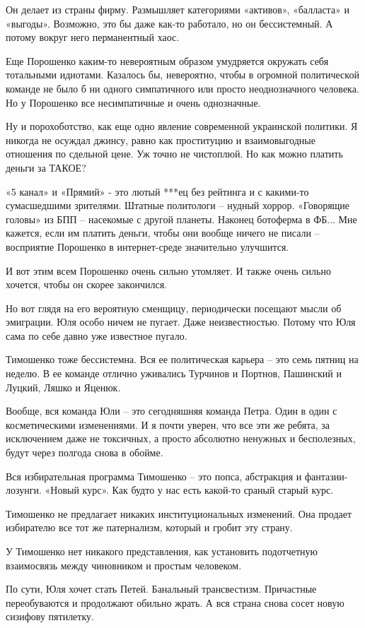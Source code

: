 Он делает из страны фирму. Размышляет категориями «активов», «балласта» и
«выгоды». Возможно, это бы даже как-то работало, но он бессистемный. А потому
вокруг него перманентный хаос.

Еще Порошенко каким-то невероятным образом умудряется окружать себя тотальными
идиотами. Казалось бы, невероятно, чтобы в огромной политической команде не
было б ни одного симпатичного или просто неоднозначного человека. Но у
Порошенко все несимпатичные и очень однозначные.

Ну и порохоботство, как еще одно явление современной украинской политики. Я
никогда не осуждал джинсу, равно как проституцию и взаимовыгодные отношения по
сдельной цене. Уж точно не чистоплюй. Но как можно платить деньги за ТАКОЕ?

«5 канал» и «Прямий» - это лютый ***ец без рейтинга и с какими-то сумасшедшими
зрителями. Штатные политологи – нудный хоррор. «Говорящие головы» из БПП –
насекомые с другой планеты. Наконец ботоферма в ФБ... Мне кажется, если им
платить деньги, чтобы они вообще ничего не писали – восприятие Порошенко в
интернет-среде значительно улучшится.

И вот этим всем Порошенко очень сильно утомляет. И также очень сильно хочется,
чтобы он скорее закончился.

Но вот глядя на его вероятную сменщицу, периодически посещают мысли об
эмиграции. Юля особо ничем не пугает. Даже неизвестностью. Потому что Юля сама
по себе давно уже известное пугало.

Тимошенко тоже бессистемна. Вся ее политическая карьера – это семь пятниц на
неделю. В ее команде отлично уживались Турчинов и Портнов, Пашинский и Луцкий,
Ляшко и Яценюк.

Вообще, вся команда Юли – это сегодняшняя команда Петра. Один в один с
косметическими изменениями. И я почти уверен, что все эти же ребята, за
исключением даже не токсичных, а просто абсолютно ненужных и бесполезных, будут
через полгода снова в обойме.

Вся избирательная программа Тимошенко – это попса, абстракция и
фантазии-лозунги. «Новый курс». Как будто у нас есть какой-то сраный старый
курс.

Тимошенко не предлагает никаких институциональных изменений. Она продает
избирателю все тот же патернализм, который и гробит эту страну.

У Тимошенко нет никакого представления, как установить подотчетную взаимосвязь
между чиновником и простым человеком.

По сути, Юля хочет стать Петей. Банальный трансвестизм. Причастные
переобуваются и продолжают обильно жрать. А вся страна снова сосет новую
сизифову пятилетку.


